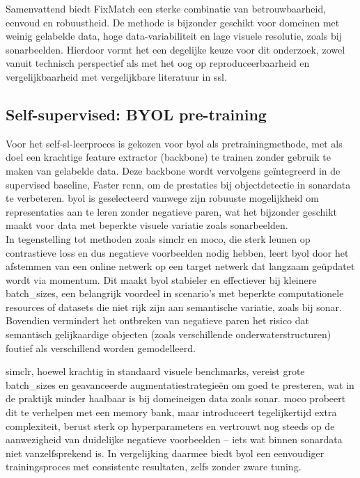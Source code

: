 Samenvattend biedt FixMatch een sterke combinatie van betrouwbaarheid, eenvoud en robuustheid. De methode is bijzonder geschikt voor domeinen met weinig gelabelde data, hoge data-variabiliteit en lage visuele resolutie, zoals bij sonarbeelden. Hierdoor vormt het een degelijke keuze voor dit onderzoek, zowel vanuit technisch perspectief als met het oog op reproduceerbaarheid en vergelijkbaarheid met vergelijkbare literatuur in \gls{ssl}.

\subsection{Self-supervised: BYOL pre-training}

Voor het \gls{self-sl}-leerproces is gekozen voor \gls{byol} als pretrainingmethode, met als doel een krachtige feature extractor (backbone) te trainen zonder gebruik te maken van gelabelde data. Deze backbone wordt vervolgens geïntegreerd in de supervised baseline, Faster \gls{rcnn}, om de prestaties bij objectdetectie in sonardata te verbeteren. \gls{byol} is geselecteerd vanwege zijn robuuste mogelijkheid om representaties aan te leren zonder negatieve paren, wat het bijzonder geschikt maakt voor data met beperkte visuele variatie zoals sonarbeelden. \\

In tegenstelling tot methoden zoals \gls{simclr} en \gls{moco}, die sterk leunen op contrastieve loss en dus negatieve voorbeelden nodig hebben, leert \gls{byol} door het afstemmen van een online netwerk op een target netwerk dat langzaam geüpdatet wordt via momentum. Dit maakt \gls{byol} stabieler en effectiever bij kleinere \glspl{batch_size}, een belangrijk voordeel in scenario's met beperkte computationele resources of datasets die niet rijk zijn aan semantische variatie, zoals bij sonar. Bovendien vermindert het ontbreken van negatieve paren het risico dat semantisch gelijkaardige objecten (zoals verschillende onderwaterstructuren) foutief als verschillend worden gemodelleerd.

\gls{simclr}, hoewel krachtig in standaard visuele benchmarks, vereist grote \glspl{batch_size} en geavanceerde augmentatiestrategieën om goed te presteren, wat in de praktijk minder haalbaar is bij domeineigen data zoals sonar. \gls{moco} probeert dit te verhelpen met een memory bank, maar introduceert tegelijkertijd extra complexiteit, berust sterk op hyperparameters en vertrouwt nog steeds op de aanwezigheid van duidelijke negatieve voorbeelden -- iets wat binnen sonardata niet vanzelfsprekend is. In vergelijking daarmee biedt \gls{byol} een eenvoudiger trainingsproces met consistente resultaten, zelfs zonder zware tuning. \\

